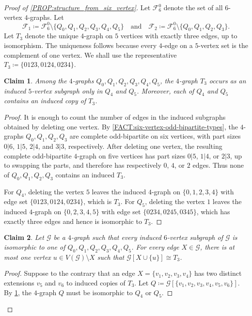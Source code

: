 \documentclass[10pt,a4paper]{article}
\theoremstyle{plain}
\newtheorem{claim}[claim]{Claim}
\theoremstyle{definition}
\begin{document}
\begin{proof}[Proof of \cref{PROP:structure_from_six_vertex}]
Let $\mathcal{F}_{6}^{0}$ denote the set of all $6$-vertex $4$-graphs.
Let
\[
\mathcal F_1\coloneqq\mathcal{F}_{6}^{0}\setminus\{Q_0,Q_1,Q_2,Q_3,Q_4,Q_5\}
\quad\text{and}\quad 
\mathcal F_2\coloneqq\mathcal{F}_{6}^{0}\setminus\{Q_0,Q_1,Q_2,Q_3\}.
\]
Let $T_3$ denote the unique $4$-graph on $5$ vertices with exactly three edges, up to isomorphism.  The uniqueness follows because every $4$-edge on a $5$-vertex set is the complement of one vertex.  We shall use the representative $T_3\coloneqq\{0123,0124,0234\}$.

\begin{claim}\label{CLM:T3_facts}
Among the $4$-graphs $Q_0,Q_1,Q_2,Q_3,Q_4,Q_5$, the $4$-graph $T_3$ occurs as an induced $5$-vertex subgraph only in $Q_4$ and $Q_5$.  Moreover, each of $Q_4$ and $Q_5$ contains an induced copy of $T_3$.
\end{claim}

\begin{proof}
It is enough to count the number of edges in the induced subgraphs obtained by deleting one vertex.  By \cref{FACT:six-vertex-odd-bipartite-types}, the $4$-graphs $Q_0,Q_1,Q_2,Q_3$ are complete odd-bipartite on six vertices, with part sizes $0|6$, $1|5$, $2|4$, and $3|3$, respectively.  After deleting one vertex, the resulting complete odd-bipartite $4$-graph on five vertices has part sizes $0|5$, $1|4$, or $2|3$, up to swapping the parts, and therefore has respectively $0$, $4$, or $2$ edges.  Thus none of $Q_0,Q_1,Q_2,Q_3$ contains an induced $T_3$.

For $Q_4$, deleting the vertex $5$ leaves the induced $4$-graph on $\{0,1,2,3,4\}$ with edge set $\{0123,0124,0234\}$, which is $T_3$.  For $Q_5$, deleting the vertex $1$ leaves the induced $4$-graph on $\{0,2,3,4,5\}$ with edge set $\{0234,0245,0345\}$, which has exactly three edges and hence is isomorphic to $T_3$.
\end{proof}

\begin{claim}\label{CLM:T3_unique}
Let $\mathcal G$ be a $4$-graph such that every induced $6$-vertex subgraph of $\mathcal G$ is isomorphic to one of $Q_0,Q_1,Q_2,Q_3,Q_4,Q_5$.  For every edge $X\in \mathcal G$, there is at most one vertex $u\in V(\mathcal G)\setminus X$ such that $\mathcal G[X\cup\{u\}]\cong T_3$.
\end{claim}

\begin{proof}
Suppose to the contrary that an edge $X=\{v_1,v_2,v_3,v_4\}$ has two distinct extensions $v_5$ and $v_6$ to induced copies of $T_3$.  Let $Q\coloneqq\mathcal G[\{v_1,v_2,v_3,v_4,v_5,v_6\}]$.
By \cref{CLM:T3_facts}, the $4$-graph $Q$ must be isomorphic to $Q_4$ or $Q_5$.


\end{proof}
\end{proof}
\end{document}
